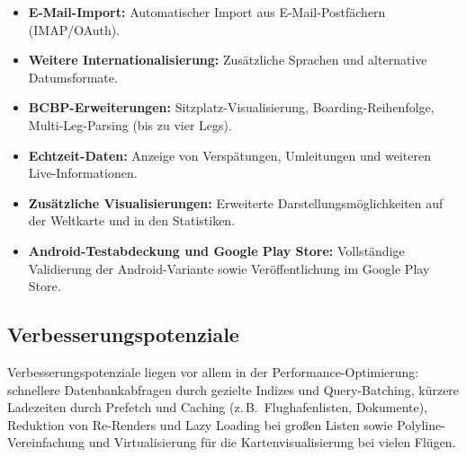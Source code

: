\begin{itemize}
  \item \textbf{E-Mail-Import:} Automatischer Import aus E-Mail-Postfächern (IMAP/OAuth).
  \item \textbf{Weitere Internationalisierung:} Zusätzliche Sprachen und alternative Datumsformate.
  \item \textbf{BCBP-Erweiterungen:} Sitzplatz-Visualisierung, Boarding-Reihenfolge, Multi-Leg-Parsing (bis zu vier Legs).
  \item \textbf{Echtzeit-Daten:} Anzeige von Verspätungen, Umleitungen und weiteren Live-Informationen.
  \item \textbf{Zusätzliche Visualisierungen:} Erweiterte Darstellungsmöglichkeiten auf der Weltkarte und in den Statistiken.
  \item \textbf{Android-Testabdeckung und Google Play Store:} Vollständige Validierung der Android-Variante sowie Veröffentlichung im Google Play Store.
\end{itemize}

\subsection{Verbesserungspotenziale}
Verbesserungspotenziale liegen vor allem in der Performance-Optimierung: schnellere Datenbankabfragen durch gezielte Indizes und Query-Batching, kürzere Ladezeiten durch Prefetch und Caching (z.\,B.\ Flughafenlisten, Dokumente), Reduktion von Re-Renders und Lazy Loading bei großen Listen sowie Polyline-Vereinfachung und Virtualisierung für die Kartenvisualisierung bei vielen Flügen.
